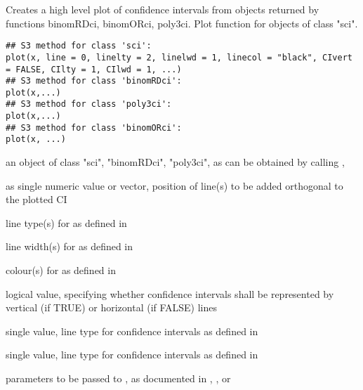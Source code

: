 \begin{Description}\relax
Creates a high level plot of confidence intervals from objects returned
by functions binomRDci, binomORci, poly3ci.
Plot function for objects of class "sci".
\end{Description}
\begin{Usage}
\begin{verbatim}
## S3 method for class 'sci':
plot(x, line = 0, linelty = 2, linelwd = 1, linecol = "black", CIvert = FALSE, CIlty = 1, CIlwd = 1, ...)
## S3 method for class 'binomRDci':
plot(x,...)
## S3 method for class 'poly3ci':
plot(x,...)
## S3 method for class 'binomORci':
plot(x, ...)
\end{verbatim}
\end{Usage}
\begin{Arguments}
\begin{ldescription}
\item[\code{x}] an object of class "sci", "binomRDci", "poly3ci", as can be obtained by calling ,            
\item[\code{line}] as single numeric value or vector, position of line(s) to be added orthogonal to the plotted CI 
\item[\code{linelty}] line type(s) for  as defined in  
\item[\code{linelwd}] line width(s) for  as defined in   
\item[\code{linecol}] colour(s) for  as defined in   
\item[\code{CIvert}] logical value, specifying whether confidence intervals shall be represented by vertical (if TRUE) or horizontal (if FALSE) lines 
\item[\code{CIlty}] single value, line type for confidence intervals as defined in   
\item[\code{CIlwd}] single value, line type for confidence intervals as defined in   
\item[\code{...}] parameters to be passed to , as documented in
, , or   
\end{ldescription}
\end{Arguments}
